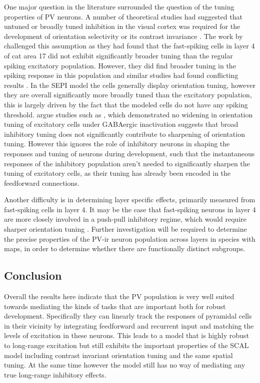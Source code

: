 One major question in the literature surrounded the question of the
tuning properties of PV neurons. A number of theoretical studies had
suggested that untuned or broadly tuned inhibition in the visual
cortex was required for the development of orientation selectivity or
its contrast invariance \citep{Somers1995, Troyer1998}. The work by
\cite{Cardin2007} challenged this assumption as they had found that
the fast-spiking cells in layer 4 of cat area 17 did not exhibit
significantly broader tuning than the regular spiking excitatory
population. However, they did find broader tuning in the spiking
response in this population and similar studies had found conflicting
results \citep{Hirsch2003, Nowak2008}. In the SEPI model the cells
generally display orientation tuning, however they are overall
significantly more broadly tuned than the excitatory population, this
is largely driven by the fact that the modeled cells do not have any
spiking threshold. \cite{Cardin2007} argue studies such as
\cite{Nelson1994}, which demonstrated no widening in orientation
tuning of excitatory cells under GABAergic inactivation suggests that
broad inhibitory tuning does not significantly contribute to
sharpening of orientation tuning. However this ignores the role of
inhibitory neurons in shaping the responses and tuning of neurons
during development, such that the instantaneous responses of the
inhibitory population aren't needed to significantly sharpen the
tuning of excitatory cells, as their tuning has already been encoded
in the feedforward connections.

Another difficulty is in determining layer specific effects,
\cite{Cardin2007} primarily measured from fast-spiking cells in layer
4. It may be the case that fast-spiking neurons in layer 4 are more
closely involved in a push-pull inhibitory regime, which would require
sharper orientation tuning \citep{Hirsch2003, Hirsch2006a}. Further
investigation will be required to determine the precise properties of
the PV-ir neuron population across layers in species with maps, in
order to determine whether there are functionally distinct subgroups.

\subsection{Conclusion}

Overall the results here indicate that the PV population is very well
suited towards mediating the kinds of tasks that are important both
for robust development. Specifically they can linearly track the
responses of pyramidal cells in their vicinity by integrating
feedforward and recurrent input and matching the levels of excitation
in these neurons. This leads to a model that is highly robust to
long-range excitation but still exhibits the important properties of
the SCAL model including contrast invariant orientation tuning and the
same spatial tuning. At the same time however the model still has no
way of mediating any true long-range inhibitory effects.

